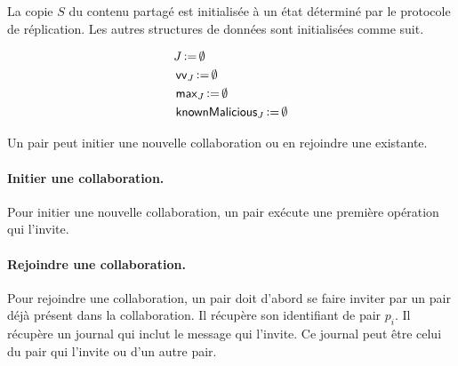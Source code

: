 La copie $S$ du contenu partagé est initialisée à un état déterminé par le protocole de réplication.
Les autres structures de données sont initialisées comme suit.

\begin{align*}
&J \operatorname{\vcentcolon=} \emptyset\\
&\operatorname{\mathsf{vv}}_J \operatorname{\vcentcolon=} \emptyset\\
&\operatorname{\mathsf{max}}_J \operatorname{\vcentcolon=} \emptyset\\
&\operatorname{\mathsf{knownMalicious}}_J \operatorname{\vcentcolon=} \emptyset\\
\end{align*}

Un pair peut initier une nouvelle collaboration ou en rejoindre une existante.

\paragraph{Initier une collaboration.}
Pour initier une nouvelle collaboration, un pair exécute une première opération qui l'invite.


\paragraph{Rejoindre une collaboration.}
Pour rejoindre une collaboration, un pair doit d'abord se faire inviter par un pair déjà présent dans la collaboration.
Il récupère son identifiant de pair $p_i$.
Il récupère un journal qui inclut le message qui l'invite.
Ce journal peut être celui du pair qui l'invite ou d'un autre pair.

